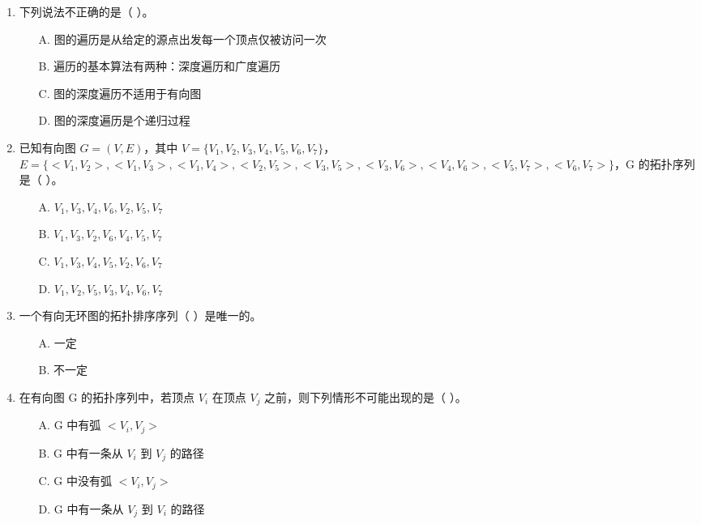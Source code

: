 \documentclass[12pt, a4paper]{article}
\begin{document}
\begin{enumerate}
    \item 下列说法不正确的是（ ）。
    \begin{enumerate}
        \item[A.] 图的遍历是从给定的源点出发每一个顶点仅被访问一次
        \item[B.] 遍历的基本算法有两种：深度遍历和广度遍历
        \item[C.] 图的深度遍历不适用于有向图
        \item[D.] 图的深度遍历是个递归过程
    \end{enumerate}
    
    \item 已知有向图 $G=(V,E)$，其中 $V=\{V_1, V_2, V_3, V_4, V_5, V_6, V_7\}$，$E=\{<V_1, V_2>, <V_1, V_3>, <V_1, V_4>, <V_2, V_5>, <V_3, V_5>, <V_3, V_6>, <V_4, V_6>, <V_5, V_7>, <V_6, V_7>\}$，G 的拓扑序列是（ ）。
    \begin{enumerate}
        \item[A.] $V_1, V_3, V_4, V_6, V_2, V_5, V_7$
        \item[B.] $V_1, V_3, V_2, V_6, V_4, V_5, V_7$
        \item[C.] $V_1, V_3, V_4, V_5, V_2, V_6, V_7$
        \item[D.] $V_1, V_2, V_5, V_3, V_4, V_6, V_7$
    \end{enumerate}
    
    \item 一个有向无环图的拓扑排序序列（ ）是唯一的。
    \begin{enumerate}
        \item[A.] 一定
        \item[B.] 不一定
    \end{enumerate}
    
    \item 在有向图 G 的拓扑序列中，若顶点 $V_i$ 在顶点 $V_j$ 之前，则下列情形不可能出现的是（ ）。
    \begin{enumerate}
        \item[A.] G 中有弧 $<V_i, V_j>$
        \item[B.] G 中有一条从 $V_i$ 到 $V_j$ 的路径
        \item[C.] G 中没有弧 $<V_i, V_j>$
        \item[D.] G 中有一条从 $V_j$ 到 $V_i$ 的路径
    \end{enumerate}
\end{enumerate}
\end{document}
